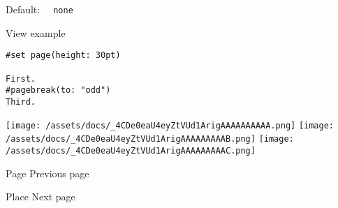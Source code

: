 Default: \texttt{\ }{\texttt{\ none\ }}\texttt{\ }


View example

\begin{verbatim}
#set page(height: 30pt)

First.
#pagebreak(to: "odd")
Third.
\end{verbatim}

\texttt{[image: /assets/docs/\_4CDe0eaU4eyZtVUd1ArigAAAAAAAAAA.png]}
\texttt{[image: /assets/docs/\_4CDe0eaU4eyZtVUd1ArigAAAAAAAAAB.png]}
\texttt{[image: /assets/docs/\_4CDe0eaU4eyZtVUd1ArigAAAAAAAAAC.png]}

\href{/docs/reference/layout/page/}{\pandocbounded{}}

{ Page } { Previous page }

\href{/docs/reference/layout/place/}{\pandocbounded{}}

{ Place } { Next page }
